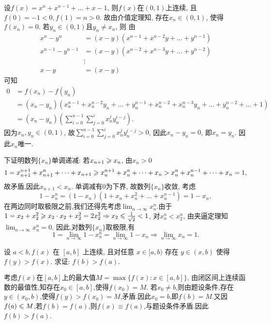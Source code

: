 \begin{solution}
    设$f(x) = x^n + x^{n-1} + \dots + x - 1$, 则$f(x)$在$(0,1)$上连续, 且$f(0) = -1 < 0, f(1) = n > 0$. 故由介值定理知, 存在$x_n \in (0,1)$, 使得$f(x_n) = 0$. 若$y_n \in (0,1)$且$y_n \ne x_n$, 则
    由\begin{align*}
        x^n - y^n         & = (x-y)(x^{n-1} + x^{n-2}y + \dots + y^{n-1}) \\
        x^{n-1} - y^{n-1} & = (x-y)(x^{n-2} + x^{n-3}y + \dots + y^{n-2}) \\
                          & \vdots                                        \\
        x - y             & = (x-y)
    \end{align*}
    可知
    \begin{align*}
        0 & = f(x_n) - f(y_n)                                                                                                      \\
          & = (x_n - y_n)(x_n^{n-1} + x_n^{n-2}y_n + \dots + y_n^{n-1} + x_n^{n-2} + x_n^{n-3}y_n + \dots + y_n^{n-2} + \dots + 1) \\
          & = (x_n - y_n)\left( \sum_{i=0}^{n-1} \sum_{j=0}^{i} x_n^j y_n^{i-j} \right).
    \end{align*}
    因为$x_n, y_n \in (0,1)$, 故$\sum_{i=0}^{n-1} \sum_{j=0}^{i} x_n^j y_n^{i-j} > 0$, 因此$x_n - y_n = 0$, 即$x_n = y_n$. 因此$x_n$唯一.

    下证明数列$\{x_n\}$单调递减:
    若$x_{n+1} \geqslant x_n$, 由$x_n > 0$
    $$1 = x_{n+1}^{n+1} + x_{n+1}^n + \dots + x_{n+1} \geqslant x_n^{n+1} + x_n^n + \dots + x_n > x_n^n + x_n^{n-1} + \dots + x_n = 1,$$故矛盾,因此$x_{n+1} < x_n$. 单调减有$0$为下界, 故数列$\{x_n\}$收敛, 考虑$$1-x_n^n = (1-x_n)(1+x_n+x_n^2+\dots+x_n^{n-1}) = 1-x_n,$$
    在两边同时取极限之前,我们还得先考虑$\lim_{n \to \infty} x_n^n$.由于$1 = x_2 + x_2^2 \geqslant x_2 \cdot x_2 + x_2^2 = 2x_2^2 \Rightarrow x_2 \leqslant \frac{1}{\sqrt{2}} < 1$, 对$x_n^n < x_2^n$, 由夹逼定理知$\lim_{n \to \infty} x_n^n = 0$. 因此,对数列$\{x_n\}$取极限,有
    $$1 = \lim_{n \to \infty} 1 - x_n^n = \lim_{n \to \infty} 1 - x_n \Rightarrow \lim_{n \to \infty} x_n = 1.$$
\end{solution}

\begin{exercise}[2.C.10]
    设 $a<b, f(x)$ 在 $[a,b]$ 上连续, 且对任意 $x \in [a,b)$ 存在 $y \in (x,b)$ 使得 $f(y)>f(x)$. 求证: $f(b)>f(a)$.
\end{exercise}

\begin{solution}
    考虑$f(x)$在$[a,b]$上的最大值$M = \max \{ f(x): x \in [a,b] \}$, 由闭区间上连续函数的最值性,知存在$x_0 \in [a,b]$,使得$f(x_0) = M$. 若$x_0 \ne b$,则由题设条件,存在$y \in (x_0,b)$,使得$f(y) > f(x_0) = M$,矛盾.因此$x_0 = b$,即$f(b) = M$.又因$f(a) \leqslant M$,若$f(b) = f(a)$,则$f(x) \equiv f(a)$,与题设条件矛盾.因此$f(b) > f(a)$.
\end{solution}

\newpage